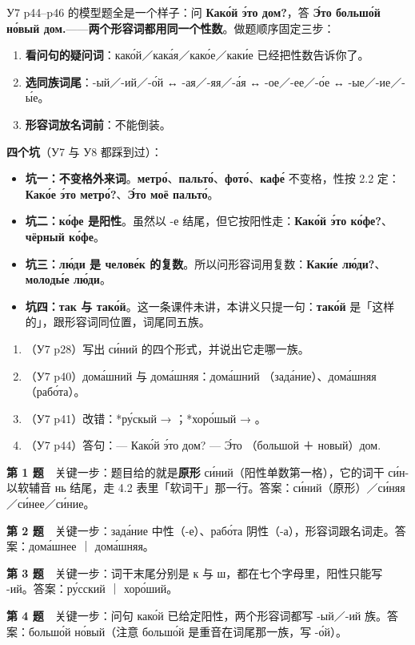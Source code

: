 У7 p44--p46 的模型题全是一个样子：问 \textbf{Како́й э́то дом?}，答 \textbf{Э́то большо́й но́вый дом.}——\textbf{两个形容词都用同一个性数}。做题顺序固定三步：

\begin{enumerate}
\item \textbf{看问句的疑问词}：како́й／кака́я／како́е／каки́е 已经把性数告诉你了。
\item \textbf{选同族词尾}：-ый／-ий／-о́й ↔ -ая／-яя／-а́я ↔ -ое／-ее／-о́е ↔ -ые／-ие／-ы́е。
\item \textbf{形容词放名词前}：不能倒装。
\end{enumerate}

\textbf{四个坑}（У7 与 У8 都踩到过）：

\begin{itemize}
\item \textbf{坑一：不变格外来词}。\textbf{метро́}、\textbf{пальто́}、\textbf{фото́}、\textbf{кафе́} 不变格，性按 2.2 定：\textbf{Како́е э́то метро́?}、\textbf{Э́то моё пальто́}。
\item \textbf{坑二：ко́фе 是阳性}。虽然以 -е 结尾，但它按阳性走：\textbf{Како́й э́то ко́фе?}、\textbf{чёрный ко́фе}。
\item \textbf{坑三：лю́ди 是 челове́к 的复数}。所以问形容词用复数：\textbf{Каки́е лю́ди?}、\textbf{молоды́е лю́ди}。
\item \textbf{坑四：так 与 тако́й}。这一条课件未讲，本讲义只提一句：\textbf{тако́й} 是「这样的」，跟形容词同位置，词尾同五族。
\end{itemize}



\begin{enumerate}[label=\textbf{第 \arabic* 题}]
\item （У7 p28）写出 си́ний 的四个形式，并说出它走哪一族。
\item （У7 p40）дома́шний 与 дома́шняя：дома́шний \blank（зада́ние）、дома́шняя \blank（рабо́та）。
\item （У7 p41）改错：*ру́скый → \blank；*хоро́шый → \blank。
\item （У7 p44）答句：— Како́й э́то дом? — Э́то \blank（большой ＋ новый）дом.
\end{enumerate}

\textbf{第 1 题}　关键一步：题目给的就是\textbf{原形} си́ний（阳性单数第一格），它的词干 си́н- 以软辅音 нь 结尾，走 4.2 表里「软词干」那一行。答案：си́ний（原形）／си́няя／си́нее／си́ние。

\textbf{第 2 题}　关键一步：зада́ние 中性（-е）、рабо́та 阴性（-а），形容词跟名词走。答案：дома́шнее ｜ дома́шняя。

\textbf{第 3 题}　关键一步：词干末尾分别是 к 与 ш，都在七个字母里，阳性只能写 -ий。答案：ру́сский ｜ хоро́ший。

\textbf{第 4 题}　关键一步：问句 како́й 已给定阳性，两个形容词都写 -ый／-ий 族。答案：большо́й но́вый（注意 большо́й 是重音在词尾那一族，写 -о́й）。

